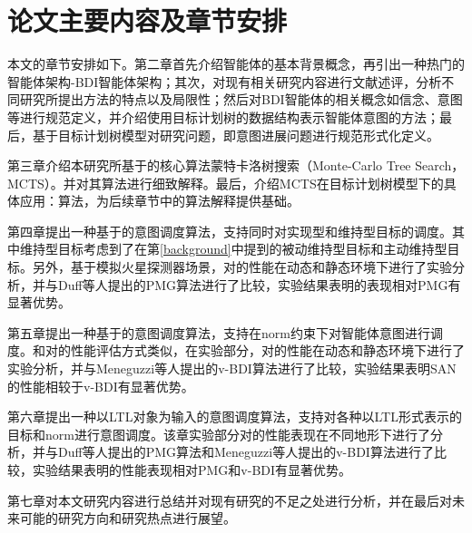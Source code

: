 \section{论文主要内容及章节安排}
本文的章节安排如下。第二章首先介绍智能体的基本背景概念，再引出一种热门的智能体架构-BDI智能体架构；其次，对现有相关研究内容进行文献述评，分析不同研究所提出方法的特点以及局限性；然后对BDI智能体的相关概念如信念、意图等进行规范定义，并介绍使用目标计划树的数据结构表示智能体意图的方法；最后，基于目标计划树模型对研究问题，即意图进展问题进行规范形式化定义。

第三章介绍本研究所基于的核心算法蒙特卡洛树搜索（Monte-Carlo Tree Search，MCTS）。并对其算法进行细致解释。最后，介绍MCTS在目标计划树模型下的具体应用：\SA 算法，为后续章节中的算法解释提供基础。

第四章提出一种基于\SA 的意图调度算法\SAM ，\SAM 支持同时对实现型和维持型目标的调度。其中维持型目标考虑到了在第\ref{background}中提到的被动维持型目标和主动维持型目标。另外，基于模拟火星探测器场景，对\SAM 的性能在动态和静态环境下进行了实验分析，并与Duff等人提出的PMG\cite{DBLP:conf/atal/DuffHT06}算法进行了比较，实验结果表明\SAM 的表现相对PMG有显著优势。

第五章提出一种基于\SA 的意图调度算法\SAN ，\SAN 支持在norm约束下对智能体意图进行调度。和对\SAM 的性能评估方式类似，在实验部分，对\SAN 的性能在动态和静态环境下进行了实验分析，并与Meneguzzi等人提出的v-BDI\cite{DBLP:journals/eaai/MeneguzziROVL15}算法进行了比较，实验结果表明SAN的性能相较于v-BDI有显著优势。

第六章提出一种以LTL对象为输入的意图调度算法\SAT，支持对各种以LTL形式表示的目标和norm进行意图调度。该章实验部分对\SAT 的性能表现在不同地形下进行了分析，并与Duff等人提出的PMG\cite{DBLP:conf/atal/DuffHT06}算法和Meneguzzi等人提出的v-BDI算法进行了比较，实验结果表明\SAT 的性能表现相对PMG和v-BDI有显著优势。

第七章对本文研究内容进行总结并对现有研究的不足之处进行分析，并在最后对未来可能的研究方向和研究热点进行展望。
